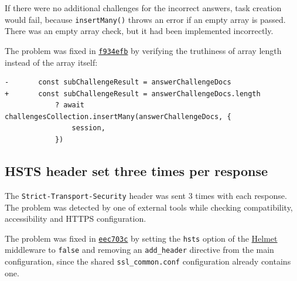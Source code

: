 If there were no additional challenges for the incorrect answers, task creation would fail, because \texttt{insertMany()} throws an error if an empty array is passed. There was an empty array check, but it had been implemented incorrectly.

The problem was fixed in \href{https://github.com/krzysdz/inz/commit/f934efb0c50f0156d73bd78fcfcd6a12b5943b1e}{\texttt{f934efb}} by verifying the truthiness of array length instead of the array itself:
\begin{verbatim}
-		const subChallengeResult = answerChallengeDocs
+		const subChallengeResult = answerChallengeDocs.length
			? await challengesCollection.insertMany(answerChallengeDocs, {
				session,
			})
\end{verbatim}

\subsection{HSTS header set three times per response}

The \texttt{Strict-Transport-Security} header was sent 3 times with each response. The problem was detected by one of external tools while checking compatibility, accessibility and HTTPS configuration.

The problem was fixed in \href{https://github.com/krzysdz/inz/commit/eec703c98ecb6720c3c2eb0ceee36ca3d7da8aa2}{\texttt{eec703c}} by setting the \texttt{hsts} option of the \href{https://helmetjs.github.io/}{Helmet} middleware to \texttt{false} and removing an \texttt{add\_header} directive from the main configuration, since the shared \texttt{ssl\_common.conf} configuration already contains one.
